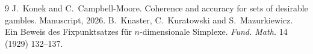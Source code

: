 \documentclass[11pt]{article}
\theoremstyle{definition}
\begin{document}
\begin{thebibliography}{9}
 J.~Konek and C.~Campbell-Moore. Coherence and accuracy for sets of desirable gambles. Manuscript, 2026.
 B.~Knaster, C.~Kuratowski and S.~Mazurkiewicz. Ein Beweis des Fixpunktsatzes f\"ur $n$-dimensionale Simplexe. \emph{Fund. Math.} 14 (1929) 132--137.
\end{thebibliography}
\end{document}
